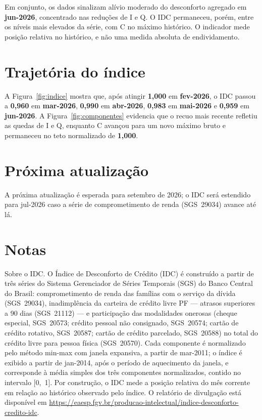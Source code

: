\documentclass[11pt,a4paper]{article}
\newcommand{\mesref}{jun-2026}
\newcommand{\proxdivulgacao}{setembro de 2026}
\newcommand{\mesproximo}{jul-2026}
\newcommand{\janelainicio}{jan-2014}   %
\newcommand{\seriesinicio}{mar-2011}   %
\begin{document}
Em conjunto, os dados sinalizam alívio moderado do desconforto agregado em
\textbf{\mesref}, concentrado nas reduções de I e Q. O IDC permaneceu, porém,
entre os níveis mais elevados da série, com C no máximo histórico. O indicador
mede posição relativa no histórico, e não uma medida absoluta de endividamento.

\section{Trajetória do índice}

A Figura~\ref{fig:indice} mostra que, após atingir \textbf{1,000} em
\textbf{fev-2026}, o IDC passou a \textbf{0,960} em \textbf{mar-2026},
\textbf{0,990} em \textbf{abr-2026}, \textbf{0,983} em \textbf{mai-2026} e
\textbf{0,959} em \textbf{jun-2026}. A Figura~\ref{fig:componentes} evidencia
que o recuo mais recente refletiu as quedas de I e Q, enquanto C avançou para
um novo máximo bruto e permaneceu no teto normalizado de \textbf{1,000}.
\section{Próxima atualização}

A próxima atualização é esperada para \proxdivulgacao; o IDC será estendido para
\mesproximo{} caso a série de comprometimento de renda (SGS~29034) avance até lá.

\section*{Notas}

\begingroup\footnotesize

Sobre o IDC. O Índice de Desconforto de Crédito (IDC) é construído a partir de
três séries do Sistema Gerenciador de Séries Temporais (SGS) do Banco Central do Brasil:
comprometimento de renda das famílias com o serviço da dívida (SGS~29034), inadimplência
da carteira de crédito livre PF --- atrasos superiores a 90 dias (SGS~21112) --- e
participação das modalidades onerosas (cheque especial, SGS~20573; crédito pessoal não
consignado, SGS~20574; cartão de crédito rotativo, SGS~20587; cartão de crédito parcelado,
SGS~20588) no total do crédito livre para pessoa física (SGS~20570). Cada componente é
normalizado pelo método min-max com janela expansiva, a partir de \seriesinicio; o índice
é exibido a partir de \janelainicio, após o período de aquecimento da janela, e corresponde
à média simples dos três componentes normalizados, contido no intervalo [0,~1]. Por
construção, o IDC mede a posição relativa do mês corrente em relação ao histórico observado
pelo índice. O relatório de divulgação está disponível em
\url{https://eaesp.fgv.br/producao-intelectual/indice-desconforto-credito-idc}.
\end{document}

